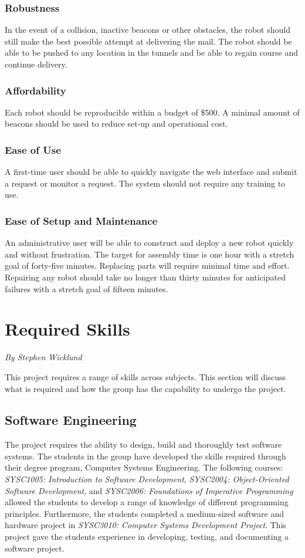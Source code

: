\documentclass[12pt]{report}
\newcommand{\sectionAuthor}[1]{{\small\vspace{-1em}\textit{#1}}\bigskip\par}
\begin{document}
\subsubsection{Robustness}
In the event of a collision, inactive beacons or other obstacles, the robot should still make the best possible attempt at delivering the mail. The robot should be able to be pushed to any location in the tunnels and be able to regain course and continue delivery.

\subsubsection{Affordability}
Each robot should be reproducible within a budget of \$500. A minimal amount of beacons should be used to reduce set-up and operational cost.

\subsubsection{Ease of Use}
A first-time user should be able to quickly navigate the web interface and submit a request or monitor a request. The system should not require any training to use.

\subsubsection{Ease of Setup and Maintenance}
An administrative user will be able to construct and deploy a new robot quickly and without frustration. The target for assembly time is one hour with a stretch goal of forty-five minutes. Replacing parts will require minimal time and effort. Repairing any robot should take no longer than thirty minutes for anticipated failures with a stretch goal of fifteen minutes.


\section{Required Skills}
\sectionAuthor{By Stephen Wicklund}
This project requires a range of skills across subjects. This section will discuss what is required and how the group has the capability to undergo the project.

\subsection{Software Engineering}
The project requires the ability to design, build and thoroughly test software systems. The students in the group have developed the skills required through their degree program, Computer Systems Engineering. The following courses: \textit{SYSC1005: Introduction to Software Development}, \textit{SYSC2004: Object-Oriented Software Development}, and \textit{SYSC2006: Foundations of Imperative Programming} allowed the students to develop a range of knowledge of different programming principles. Furthermore, the students completed a medium-sized software and hardware project in \textit{SYSC3010: Computer Systems Development Project}. This project gave the students experience in developing, testing, and documenting a software project.
\end{document}
